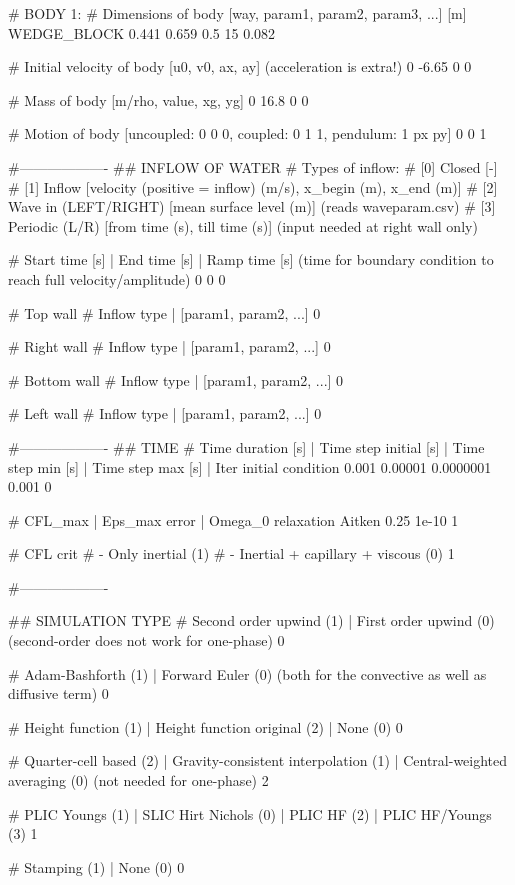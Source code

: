 # BODY 1:
# Dimensions of body [way, param1, param2, param3, ...] [m]
WEDGE_BLOCK 0.441 0.659 0.5 15 0.082

# Initial velocity of body [u0, v0, ax, ay] (acceleration is extra!)
0 -6.65 0 0

# Mass of body [m/rho, value, xg, yg]
0 16.8 0 0

# Motion of body [uncoupled: 0 0 0, coupled: 0 1 1, pendulum: 1 px py]
0 0 1

#-------------------
## INFLOW OF WATER
# Types of inflow:
# [0] Closed                [-]
# [1] Inflow                [velocity (positive = inflow) (m/s), x_begin (m), x_end (m)]
# [2] Wave in (LEFT/RIGHT)  [mean surface level (m)] (reads waveparam.csv)
# [3] Periodic (L/R)        [from time (s), till time (s)] (input needed at right wall only)

# Start time [s] | End time [s] | Ramp time [s] (time for boundary condition to reach full velocity/amplitude)
0 0 0

# Top wall
# Inflow type | [param1, param2, ...]
0

# Right wall
# Inflow type | [param1, param2, ...]
0

# Bottom wall
# Inflow type | [param1, param2, ...]
0

# Left wall
# Inflow type | [param1, param2, ...]
0

#-------------------
## TIME
# Time duration [s]	| Time step initial [s]		| Time step min [s]	| Time step max [s] | Iter initial condition
0.001 0.00001 0.0000001 0.001 0

# CFL_max | Eps_max error | Omega_0 relaxation Aitken
0.25		1e-10	        1

# CFL crit
# - Only inertial (1)
# - Inertial + capillary + viscous (0)
1

#-------------------

## SIMULATION TYPE
# Second order upwind (1)	| First order upwind (0) (second-order does not work for one-phase)
0

# Adam-Bashforth (1)	| Forward Euler (0) (both for the convective as well as diffusive term)
0

# Height function (1)	| Height function original (2) | None (0)
0

# Quarter-cell based (2) | Gravity-consistent interpolation (1)	|	Central-weighted averaging (0) (not needed for one-phase)
2

# PLIC Youngs (1)	| SLIC Hirt Nichols (0) | PLIC HF (2) | PLIC HF/Youngs (3)
1

# Stamping (1)	| None (0)
0

